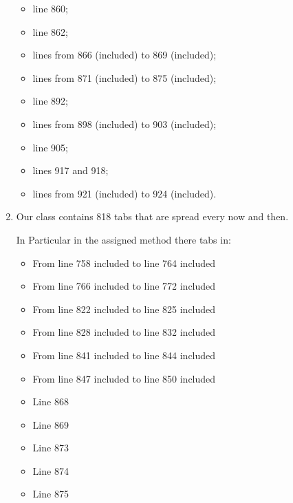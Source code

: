 \begin{enumerate}
\begin{itemize}
		    \item line 860;
		    \item line 862;
		    \item lines from 866 (included) to 869 (included);
		    \item lines from 871 (included) to 875 (included);
		    \item line 892;
		    \item lines from 898 (included) to 903 (included);
		    \item line 905;
		    \item lines 917 and 918;
		    \item lines from 921 (included) to 924 (included).
	    \end{itemize}
	\item Our class contains 818 tabs that are spread every now and then.
	
	In Particular in the assigned method there tabs in:
	\begin{itemize}
		\item From line 758 included to line 764 included
		\item From line 766 included to line 772 included
		\item From line 822 included to line 825 included
		\item From line 828 included to line 832 included
		\item From line 841 included to line 844 included
		\item From line 847 included to line 850 included
		\item Line 868
		\item Line 869
		\item Line 873
		\item Line 874
		\item Line 875
	\end{itemize}
\end{enumerate}
